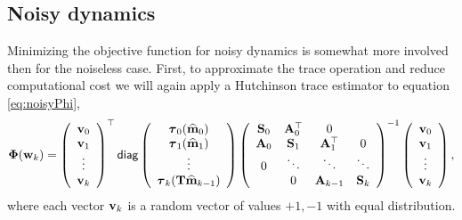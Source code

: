 \documentclass[11pt]{article}
\newcommand{\bfA}	{{\bf{A}}}
\newcommand{\bfS}	{{\bf{S}}}
\newcommand{\bfT}	{{\bf{T}}}
\newcommand{\bfm}	{{\bf{m}}}
\newcommand{\bfv}	{{\bf{v}}}
\newcommand{\bfw}	{{\bf{w}}}
\newcommand{\bfPhi}     {{\boldsymbol \Phi}}
\newcommand{\bftau}      {{\boldsymbol \tau}}
\newcommand{\bfmhat}    {{\widehat{\bfm}}}
\begin{document}
\subsection{Noisy dynamics}

Minimizing the objective function for noisy dynamics is  somewhat more involved then for the noiseless case. 
First, to approximate the trace operation and reduce computational cost we will again apply a Hutchinson trace estimator to equation \eqref{eq:noisyPhi},
\begin{equation}
\label{eq:noisyPhiV}
\bfPhi(\bfw_k) =  
\left(\begin{array}{c} \bfv_0 \\ \bfv_1\\ \vdots\\ \bfv_k \end{array}\right)^{\top}
{\sf diag}
\left( \begin{array}{c}
\bftau_0(\bfmhat_0) \\ 
\bftau_1(\bfmhat_1)  \\
\vdots \\
\bftau_k(\bfT\bfmhat_{k-1})\end{array}\right)
\left(\begin{array}{cccc}
 \bfS_0 &  \bfA^{\top}_0 & 0 & \\
 \bfA_0 & \bfS_1 & \bfA^{\top}_1 & 0 \\
 0 & \ddots & \ddots & \ddots \\
 & 0 & \bfA_{k-1} & \bfS_k
  \end{array}\right)^{-1}
  \left(\begin{array}{c} \bfv_0 \\ \bfv_1\\ \vdots\\ \bfv_k \end{array}\right),
\end{equation}
where each vector $\bfv_k$ is a random vector of values $+1,-1$ with equal distribution. 
\end{document}
